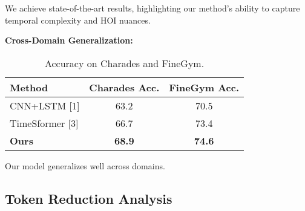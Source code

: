 \documentclass{article}
\begin{document}
We achieve state-of-the-art results, highlighting our method’s ability to capture temporal complexity and HOI nuances.

\textbf{Cross-Domain Generalization:}
\begin{table}[h]
\caption{Accuracy on Charades and FineGym.}
\label{cross-domain}
\vskip 0.15in
\begin{center}
\begin{small}
\begin{sc}
\begin{tabular}{lcc}
\toprule
Method & Charades Acc. & FineGym Acc. \\
\midrule
CNN+LSTM [1] & 63.2 & 70.5 \\
TimeSformer [3] & 66.7 & 73.4 \\
\textbf{Ours} & \textbf{68.9} & \textbf{74.6} \\
\bottomrule
\end{tabular}
\end{sc}
\end{small}
\end{center}
\vskip -0.1in
\end{table}

Our model generalizes well across domains.

\subsection{Token Reduction Analysis}
\begin{table}[h]
\caption{Impact of Token Reduction on EPIC-KITCHENS.}
\label{token-reduction}
\vskip 0.15in
\begin{center}
\begin{small}
\begin{sc}
\end{sc}
\end{small}
\end{center}
\vskip -0.1in
\end{table}
\end{document}
